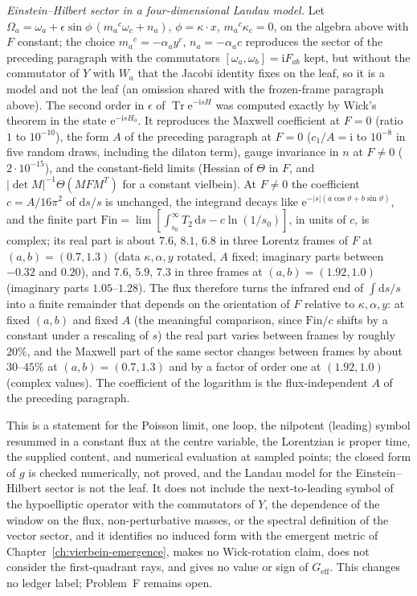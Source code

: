 \emph{Einstein--Hilbert sector in a four-dimensional Landau model.} Let \(\Omega_a=\omega_a+\epsilon\sin\phi\,(m_a{}^c\omega_c+n_a)\), \(\phi=\kappa\cdot x\), \(m_a{}^c\kappa_c=0\), on the algebra above with \(F\) constant; the choice \(m_a{}^c=-\alpha_ay^c\), \(n_a=-\alpha_a c\) reproduces the sector of the preceding paragraph with the commutators \([\omega_a,\omega_b]=\mathrm iF_{ab}\) kept, but without the commutator of \(Y\) with \(W_a\) that the Jacobi identity fixes on the leaf, so it is a model and not the leaf (an omission shared with the frozen-frame paragraph above). The second order in \(\epsilon\) of \(\operatorname{Tr}\mathrm e^{-\mathrm isH}\) was computed exactly by Wick's theorem in the state \(\mathrm e^{-\mathrm isH_0}\). It reproduces the Maxwell coefficient at \(F=0\) (ratio \(1\) to \(10^{-10}\)), the form \(A\) of the preceding paragraph at \(F=0\) (\(c_1/A=\mathrm i\) to \(10^{-8}\) in five random draws, including the dilaton term), gauge invariance in \(n\) at \(F\ne0\) (\(2\cdot10^{-15}\)), and the constant-field limits (Hessian of \(\Theta\) in \(F\), and \(|\det M|^{-1}\Theta(MFM^T)\) for a constant vielbein). At \(F\ne0\) the coefficient \(c=A/16\pi^2\) of \(\mathrm ds/s\) is unchanged, the integrand decays like \(\mathrm e^{-|s|(a\cos\vartheta+b\sin\vartheta)}\), and the finite part \(\mathrm{Fin}=\lim[\int_{s_0}^\infty T_2\,\mathrm ds-c\ln(1/s_0)]\), in units of \(c\), is complex; its real part is about \(7.6\), \(8.1\), \(6.8\) in three Lorentz frames of \(F\) at \((a,b)=(0.7,1.3)\) (data \(\kappa,\alpha,y\) rotated, \(A\) fixed; imaginary parts between \(-0.32\) and \(0.20\)), and \(7.6\), \(5.9\), \(7.3\) in three frames at \((a,b)=(1.92,1.0)\) (imaginary parts \(1.05\)--\(1.28\)). The flux therefore turns the infrared end of \(\int\mathrm ds/s\) into a finite remainder that depends on the orientation of \(F\) relative to \(\kappa,\alpha,y\): at fixed \((a,b)\) and fixed \(A\) (the meaningful comparison, since \(\mathrm{Fin}/c\) shifts by a constant under a rescaling of \(s\)) the real part varies between frames by roughly \(20\%\), and the Maxwell part of the same sector changes between frames by about \(30\)--\(45\%\) at \((a,b)=(0.7,1.3)\) and by a factor of order one at \((1.92,1.0)\) (complex values). The coefficient of the logarithm is the flux-independent \(A\) of the preceding paragraph.

This is a statement for the Poisson limit, one loop, the nilpotent (leading) symbol resummed in a constant flux at the centre variable, the Lorentzian \(\mathrm i\epsilon\) proper time, the supplied content, and numerical evaluation at sampled points; the closed form of \(g\) is checked numerically, not proved, and the Landau model for the Einstein--Hilbert sector is not the leaf. It does not include the next-to-leading symbol of the hypoelliptic operator with the commutators of \(Y\), the dependence of the window on the flux, non-perturbative masses, or the spectral definition of the vector sector, and it identifies no induced form with the emergent metric of Chapter~\ref{ch:vierbein-emergence}, makes no Wick-rotation claim, does not consider the first-quadrant rays, and gives no value or sign of \(G_{\mathrm{eff}}\). This changes no ledger label; Problem~F remains open.
